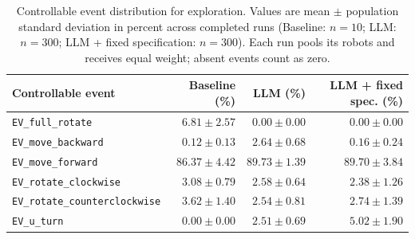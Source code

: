 \begin{table}[htbp]
\centering
\small
\caption{Controllable event distribution for exploration. Values are mean $\pm$ population standard deviation in percent across completed runs (Baseline: $n=10$; LLM: $n=300$; LLM + fixed specification: $n=300$). Each run pools its robots and receives equal weight; absent events count as zero.}
\label{tab:exploration-controllable-events}
\begin{tabular}{lrrr}
\hline
Controllable event & Baseline (\%) & LLM (\%) & LLM + fixed spec. (\%) \\
\hline
\texttt{EV\_full\_rotate} & $6.81 \pm 2.57$ & $0.00 \pm 0.00$ & $0.00 \pm 0.00$ \\
\texttt{EV\_move\_backward} & $0.12 \pm 0.13$ & $2.64 \pm 0.68$ & $0.16 \pm 0.24$ \\
\texttt{EV\_move\_forward} & $86.37 \pm 4.42$ & $89.73 \pm 1.39$ & $89.70 \pm 3.84$ \\
\texttt{EV\_rotate\_clockwise} & $3.08 \pm 0.79$ & $2.58 \pm 0.64$ & $2.38 \pm 1.26$ \\
\texttt{EV\_rotate\_counterclockwise} & $3.62 \pm 1.40$ & $2.54 \pm 0.81$ & $2.74 \pm 1.39$ \\
\texttt{EV\_u\_turn} & $0.00 \pm 0.00$ & $2.51 \pm 0.69$ & $5.02 \pm 1.90$ \\
\hline
\end{tabular}
\end{table}
